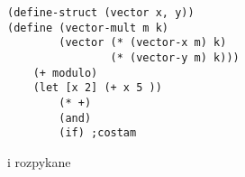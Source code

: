 \documentclass{article}
\begin{document}
\ttfamily

\begin{lstlisting}[language=najlepszy]
(define-struct (vector x, y))
(define (vector-mult m k) 
        (vector (* (vector-x m) k) 
                (* (vector-y m) k)))
    (+ modulo)
    (let [x 2] (+ x 5 ))
        (* +)
        (and)
        (if) ;costam
\end{lstlisting}

i rozpykane\kondow
\end{document}

